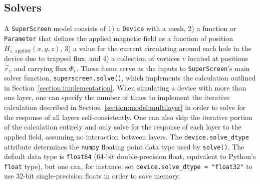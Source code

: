 \documentclass[final,3p,times]{elsarticle}
\newcommand{\inline}[1]{\texttt{#1}\xspace}
\newcommand{\SuperScreen}{\inline{SuperScreen}}
\newenvironment{code}{\captionsetup{type=listing}}{\hfill}
\begin{document}
\subsection{Solvers}
\label{section:overview:solvers}

A \SuperScreen model consists of 1) a \inline{Device} with a mesh, 2) a function or \inline{Parameter} that defines the applied magnetic field as a function of position $H_{z,\,\mathrm{applied}}(x, y, z)$, 3) a value for the current circulating around each hole in the device due to trapped flux, and 4) a collection of vortices $v$ located at positions $\vec{r}_v$ and carrying flux $\Phi_v$. These items serve as the inputs to \SuperScreen's main solver function, \inline{superscreen.solve()}, which implements the calculation outlined in Section~\ref{section:implementation}. When simulating a device with more than one layer, one can specify the number of times to implement the iterative calculation described in Section~\ref{section:model:multilayer} in order to solve for the response of all layers self-consistently. One can also skip the iterative portion of the calculation entirely and only solve for the response of each layer to the applied field, assuming no interaction between layers. The \inline{device.solve_dtype} attribute determines the \inline{numpy} floating point data type used by \inline{solve()}. The default data type is \inline{float64} (64-bit double-precision float, equivalent to Python's \inline{float} type), but one can, for instance, set \inline{device.solve_dtype = "float32"} to use 32-bit single-precision floats in order to save memory.



\end{document}
